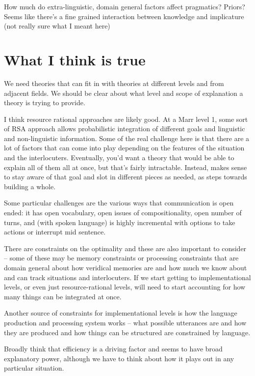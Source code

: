 \documentclass[]{article}
\begin{document}
How much do extra-linguistic, domain general factors affect pragmatics? Priors? Seems like there's a fine grained interaction between knowledge and implicature (not really sure what I meant here)

\section{What I think is true}

We need theories that can fit in with theories at different levels and from adjacent fields. We should be clear about what level and scope of explanation a theory is trying to provide. 

I think resource rational approaches are likely good. At a Marr level 1, some sort of RSA approach allows probabilistic integration of different goals and linguistic and non-linguistic information. Some of the real challenge here is that there are a lot of factors that can come into play depending on the features of the situation and the interlocuters. Eventually, you'd want a theory that would be able to explain all of them all at once, but that's fairly intractable. Instead, makes sense to stay aware of that goal and slot in different pieces as needed, as steps towards building a whole. 

Some particular challenges are the various ways that communication is open ended: it has open vocabulary, open issues of compositionality, open number of turns, and (with spoken language) is highly incremental with options to take actions or interrupt mid sentence. 

There are constraints on the optimality and these are also important to consider -- some of these may be memory constraints or processing constraints that are domain general about how veridical memories are and how much we know about and can track situations and interlocuters. If we start getting to implementational levels, or even just resource-rational levels, will need to start accounting for how many things can be integrated at once. 

Another source of constraints for implementational levels is how the language production and processing system works -- what possible utterances are and how they are produced and how things can be structured are constrained by language. 

Broadly think that efficiency is a driving factor and seems to have broad explanatory power, although we have to think about how it plays out in any particular situation. 
\end{document}
